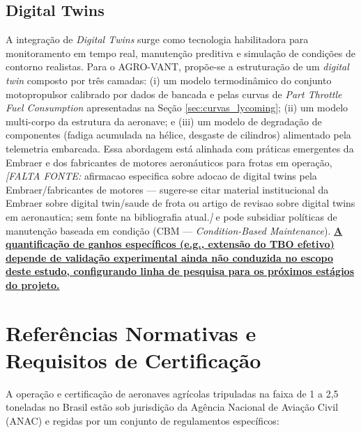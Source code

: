 \documentclass[a4paper,12pt]{article}
\newcommand{\autoeval}[1]{\textbf{\underline{#1}}}
\newcommand{\citesugerida}[1]{{\color{red}\textit{[FALTA FONTE: }#1\textit{]}}}
\begin{document}
\subsection{Digital Twins}

A integração de \textit{Digital Twins} surge como tecnologia habilitadora para monitoramento em tempo real, manutenção preditiva e simulação de condições de contorno realistas. Para o AGRO-VANT, propõe-se a estruturação de um \textit{digital twin} composto por três camadas: (i) um modelo termodinâmico do conjunto motopropulsor calibrado por dados de bancada e pelas curvas de \textit{Part Throttle Fuel Consumption} apresentadas na Seção \ref{sec:curvas_lycoming}; (ii) um modelo multi-corpo da estrutura da aeronave; e (iii) um modelo de degradação de componentes (fadiga acumulada na hélice, desgaste de cilindros) alimentado pela telemetria embarcada. Essa abordagem está alinhada com práticas emergentes da Embraer e dos fabricantes de motores aeronáuticos para frotas em operação,\citesugerida{afirmacao especifica sobre adocao de digital twins pela Embraer/fabricantes de motores --- sugere-se citar material institucional da Embraer sobre digital twin/saude de frota ou artigo de revisao sobre digital twins em aeronautica; sem fonte na bibliografia atual.} e pode subsidiar políticas de manutenção baseada em condição (CBM --- \textit{Condition-Based Maintenance}). \autoeval{A quantificação de ganhos específicos (e.g., extensão do TBO efetivo) depende de validação experimental ainda não conduzida no escopo deste estudo, configurando linha de pesquisa para os próximos estágios do projeto.}

\section{Referências Normativas e Requisitos de Certificação}

A operação e certificação de aeronaves agrícolas tripuladas na faixa de 1 a 2{,}5 toneladas no Brasil estão sob jurisdição da Agência Nacional de Aviação Civil (ANAC) e regidas por um conjunto de regulamentos específicos:
\end{document}
